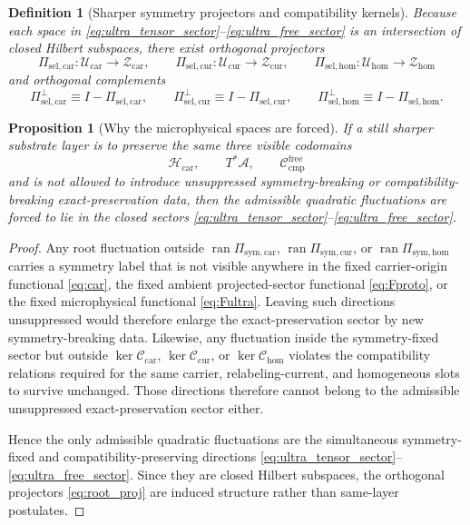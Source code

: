 \documentclass[11pt]{article}
\newcommand{\Sub}{\mathcal A}
\newcommand{\CompFree}{\mathscr C_{\mathrm{cmp}}^{\mathrm{free}}}
\newcommand{\CarrierClass}{\mathscr H_{\mathrm{car}}}
\newcommand{\UltraTensorClass}{\mathscr Z_{\mathrm{car}}}
\newcommand{\UltraRelabelClass}{\mathscr Z_{\mathrm{cur}}}
\newcommand{\UltraFreeClass}{\mathscr Z_{\mathrm{hom}}}
\newcommand{\RootTensorClass}{\mathscr U_{\mathrm{car}}}
\newcommand{\RootRelabelClass}{\mathscr U_{\mathrm{cur}}}
\newcommand{\RootFreeClass}{\mathscr U_{\mathrm{hom}}}
\newcommand{\RootCarProj}{\Pi_{\mathrm{sel,car}}}
\newcommand{\RootCurProj}{\Pi_{\mathrm{sel,cur}}}
\newcommand{\RootHomProj}{\Pi_{\mathrm{sel,hom}}}
\newcommand{\RootCarPerp}{\Pi_{\mathrm{sel,car}}^{\perp}}
\newcommand{\RootCurPerp}{\Pi_{\mathrm{sel,cur}}^{\perp}}
\newcommand{\RootHomPerp}{\Pi_{\mathrm{sel,hom}}^{\perp}}
\newcommand{\TensorSymProj}{\Pi_{\mathrm{sym,car}}}
\newcommand{\CurSymProj}{\Pi_{\mathrm{sym,cur}}}
\newcommand{\HomSymProj}{\Pi_{\mathrm{sym,hom}}}
\newcommand{\TensorCompat}{\mathcal C_{\mathrm{car}}}
\newcommand{\CurCompat}{\mathcal C_{\mathrm{cur}}}
\newcommand{\HomCompat}{\mathcal C_{\mathrm{hom}}}
\newtheorem{definition}{Definition}
\newtheorem{proposition}{Proposition}
\begin{document}
\begin{definition}[Sharper symmetry projectors and compatibility kernels]
Because each space in \eqref{eq:ultra_tensor_sector}--\eqref{eq:ultra_free_sector} is an intersection of closed Hilbert subspaces, there exist orthogonal projectors
\begin{equation}
\RootCarProj:\RootTensorClass\to\UltraTensorClass,
\qquad
\RootCurProj:\RootRelabelClass\to\UltraRelabelClass,
\qquad
\RootHomProj:\RootFreeClass\to\UltraFreeClass
\label{eq:root_proj}
\end{equation}
and orthogonal complements
\begin{equation}
\RootCarPerp\equiv I-\RootCarProj,
\qquad
\RootCurPerp\equiv I-\RootCurProj,
\qquad
\RootHomPerp\equiv I-\RootHomProj.
\label{eq:root_perp}
\end{equation}
\end{definition}

\begin{proposition}[Why the microphysical spaces are forced]
\label{prop:ultra_forced}
If a still sharper substrate layer is to preserve the same three visible codomains
\[
\CarrierClass,\qquad
T^*\Sub,\qquad
\CompFree
\]
and is not allowed to introduce unsuppressed symmetry-breaking or compatibility-breaking exact-preservation data, then the admissible quadratic fluctuations are forced to lie in the closed sectors \eqref{eq:ultra_tensor_sector}--\eqref{eq:ultra_free_sector}.
\end{proposition}

\begin{proof}
Any root fluctuation outside \(\operatorname{ran}\TensorSymProj\), \(\operatorname{ran}\CurSymProj\), or \(\operatorname{ran}\HomSymProj\) carries a symmetry label that is not visible anywhere in the fixed carrier-origin functional \eqref{eq:car}, the fixed ambient projected-sector functional \eqref{eq:Fproto}, or the fixed microphysical functional \eqref{eq:Fultra}. Leaving such directions unsuppressed would therefore enlarge the exact-preservation sector by new symmetry-breaking data. Likewise, any fluctuation inside the symmetry-fixed sector but outside \(\ker\TensorCompat\), \(\ker\CurCompat\), or \(\ker\HomCompat\) violates the compatibility relations required for the same carrier, relabeling-current, and homogeneous slots to survive unchanged. Those directions therefore cannot belong to the admissible unsuppressed exact-preservation sector either.

Hence the only admissible quadratic fluctuations are the simultaneous symmetry-fixed and compatibility-preserving directions \eqref{eq:ultra_tensor_sector}--\eqref{eq:ultra_free_sector}. Since they are closed Hilbert subspaces, the orthogonal projectors \eqref{eq:root_proj} are induced structure rather than same-layer postulates.
\end{proof}
\end{document}
